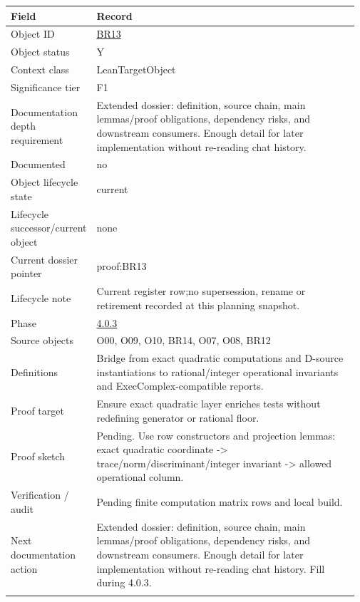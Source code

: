 \begin{longtable}{L{0.16\linewidth} L{0.81\linewidth}}
\hline
\textbf{Field} & \textbf{Record}\\
\hline
Object ID & \hyperlink{object-row-BR13}{BR13}\\
\hline\addlinespace[0.20em]
Object status & Y\\
\hline\addlinespace[0.20em]
Context class & LeanTargetObject\\
\hline\addlinespace[0.20em]
Significance tier & F1\\
\hline\addlinespace[0.20em]
Documentation depth requirement & Extended dossier: definition, source chain, main lemmas/\allowbreak{}proof obligations, dependency risks, and downstream consumers. Enough detail for later implementation without re-reading chat history.\\
\hline\addlinespace[0.20em]
Documented & no\\
\hline\addlinespace[0.20em]
Object lifecycle state & current\\
\hline\addlinespace[0.20em]
Lifecycle successor/\allowbreak{}current object & none\\
\hline\addlinespace[0.20em]
Current dossier pointer & proof:BR13\\
\hline\addlinespace[0.20em]
Lifecycle note & Current register row;\newline no supersession, rename or retirement recorded at this planning snapshot.\\
\hline\addlinespace[0.20em]
Phase & \hyperlink{phase-row-4-0-3}{4.0.3}\\
\hline\addlinespace[0.20em]
Source objects & O00, O09, O10, BR14, O07, O08, BR12\\
\hline\addlinespace[0.20em]
Definitions & Bridge from exact quadratic computations and D-source instantiations to rational/\allowbreak{}integer operational invariants and ExecComplex-compatible reports.\\
\hline\addlinespace[0.20em]
Proof target & Ensure exact quadratic layer enriches tests without redefining generator or rational floor.\\
\hline\addlinespace[0.20em]
Proof sketch & Pending. Use row constructors and projection lemmas: exact quadratic coordinate -> trace/\allowbreak{}norm/\allowbreak{}discriminant/\allowbreak{}integer invariant -> allowed operational column.\\
\hline\addlinespace[0.20em]
Verification /\allowbreak{} audit & Pending finite computation matrix rows and local build.\\
\hline\addlinespace[0.20em]
Next documentation action & Extended dossier: definition, source chain, main lemmas/\allowbreak{}proof obligations, dependency risks, and downstream consumers. Enough detail for later implementation without re-reading chat history. Fill during 4.0.3.\\
\hline\addlinespace[0.20em]
\end{longtable}
